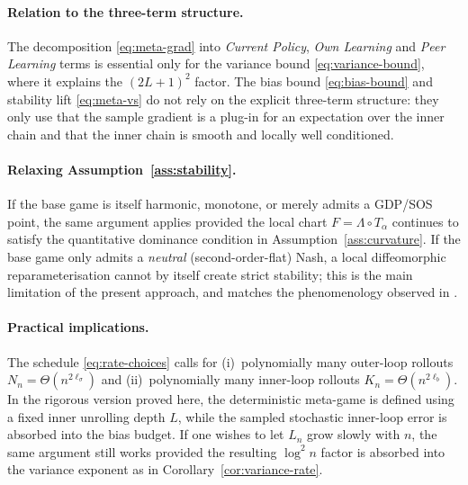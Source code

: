 \documentclass[11pt]{article}
\theoremstyle{definition}
\begin{document}
\paragraph{Relation to the three-term structure.} The decomposition \eqref{eq:meta-grad} into \emph{Current Policy}, \emph{Own Learning} and \emph{Peer Learning} terms is essential only for the variance bound \eqref{eq:variance-bound}, where it explains the $(2L+1)^2$ factor. The bias bound \eqref{eq:bias-bound} and stability lift \eqref{eq:meta-vs} do not rely on the explicit three-term structure: they only use that the sample gradient is a plug-in for an expectation over the inner chain and that the inner chain is smooth and locally well conditioned.

\paragraph{Relaxing Assumption~\ref{ass:stability}.} If the base game is itself harmonic, monotone, or merely admits a GDP/SOS point, the same argument applies provided the local chart $F=\Lambda\circ T_\alpha$ continues to satisfy the quantitative dominance condition in Assumption~\ref{ass:curvature}. If the base game only admits a \emph{neutral} (second-order-flat) Nash, a local diffeomorphic reparameterisation cannot by itself create strict stability; this is the main limitation of the present approach, and matches the phenomenology observed in \cite[§5]{Giannou2022}.

\paragraph{Practical implications.} The schedule \eqref{eq:rate-choices} calls for (i)~polynomially many outer-loop rollouts $N_n=\Theta(n^{2\ell_\sigma})$ and (ii)~polynomially many inner-loop rollouts $K_n=\Theta(n^{2\ell_b})$. In the rigorous version proved here, the deterministic meta-game is defined using a fixed inner unrolling depth $L$, while the sampled stochastic inner-loop error is absorbed into the bias budget. If one wishes to let $L_n$ grow slowly with $n$, the same argument still works provided the resulting $\log^2 n$ factor is absorbed into the variance exponent as in Corollary~\ref{cor:variance-rate}.
\end{document}
